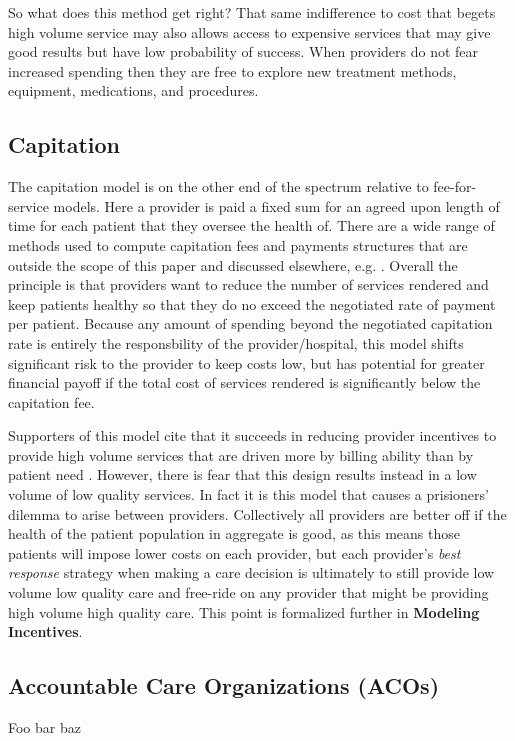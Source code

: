 \documentclass{article}
\begin{document}
So what does this method get right? That same indifference to cost that begets high volume service may also allows access to expensive services that may give good results but have low probability of success. When providers do not fear increased spending then they are free to explore new treatment methods, equipment, medications, and procedures.

\subsection*{Capitation}
The capitation model is on the other end of the spectrum relative to fee-for-service models. Here a provider is paid a fixed sum for an agreed upon length of time for each patient that they oversee the health of. There are a wide range of methods used to compute capitation fees and payments structures that are outside the scope of this paper and discussed elsewhere, e.g. \cite{capfees}. Overall the principle is that providers want to reduce the number of services rendered and keep patients healthy so that they do no exceed the negotiated rate of payment per patient. Because any amount of spending beyond the negotiated capitation rate is entirely the responsbility of the provider/hospital, this model shifts significant risk to the provider to keep costs low, but has potential for greater financial payoff if the total cost of services rendered is significantly below the capitation fee.

Supporters of this model cite that it succeeds in reducing provider incentives to provide high volume services that are driven more by billing ability than by patient need \cite{blended}. However, there is fear that this design results instead in a low volume of low quality services. In fact it is this model that causes a prisioners' dilemma to arise between providers. Collectively all providers are better off if the health of the patient population in aggregate is good, as this means those patients will impose lower costs on each provider, but each provider's \emph{best response} strategy when making a care decision is ultimately to still provide low volume low quality care and free-ride on any provider that might be providing high volume high quality care. This point is formalized further in \textbf{Modeling Incentives}.

\subsection*{Accountable Care Organizations (ACOs)}
Foo bar baz
\end{document}
